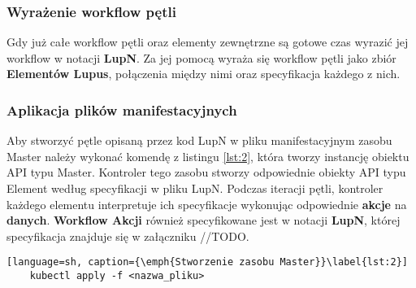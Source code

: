 \subsubsection{Wyrażenie workflow pętli}

Gdy już całe workflow pętli oraz elementy zewnętrzne są gotowe czas wyrazić jej workflow w notacji \textbf{LupN}. Za jej pomocą wyraża się workflow pętli jako zbiór  \textbf{Elementów Lupus}, połączenia między nimi oraz specyfikacja każdego z nich.

\subsubsection{Aplikacja plików manifestacyjnych}

Aby stworzyć pętle opisaną przez kod LupN w pliku manifestacyjnym zasobu Master należy wykonać komendę z listingu \ref{lst:2}, która tworzy instancję obiektu API typu Master. Kontroler tego zasobu stworzy odpowiednie obiekty API typu Element według specyfikacji w pliku LupN. Podczas iteracji pętli, kontroler każdego elementu interpretuje ich specyfikacje wykonując odpowiednie \textbf{akcje} na \textbf{danych}. \textbf{Workflow Akcji} również specyfikowane jest w notacji \textbf{LupN}, której specyfikacja znajduje się w załączniku //TODO.


\begin{lstlisting}[language=sh, caption={\emph{Stworzenie zasobu Master}}\label{lst:2}]
    kubectl apply -f <nazwa_pliku>
\end{lstlisting}
